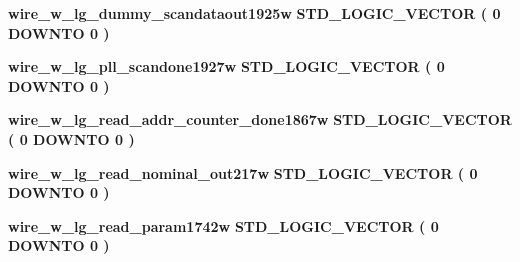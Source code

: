 \begin{DoxyCompactItemize}
\item 
{\bf wire\+\_\+w\+\_\+lg\+\_\+dummy\+\_\+scandataout1925w} {\bfseries \textcolor{comment}{S\+T\+D\+\_\+\+L\+O\+G\+I\+C\+\_\+\+V\+E\+C\+T\+OR}\textcolor{vhdlchar}{ }\textcolor{vhdlchar}{(}\textcolor{vhdlchar}{ }\textcolor{vhdlchar}{ } \textcolor{vhdldigit}{0} \textcolor{vhdlchar}{ }\textcolor{keywordflow}{D\+O\+W\+N\+TO}\textcolor{vhdlchar}{ }\textcolor{vhdlchar}{ } \textcolor{vhdldigit}{0} \textcolor{vhdlchar}{ }\textcolor{vhdlchar}{)}\textcolor{vhdlchar}{ }} 
\item 
{\bf wire\+\_\+w\+\_\+lg\+\_\+pll\+\_\+scandone1927w} {\bfseries \textcolor{comment}{S\+T\+D\+\_\+\+L\+O\+G\+I\+C\+\_\+\+V\+E\+C\+T\+OR}\textcolor{vhdlchar}{ }\textcolor{vhdlchar}{(}\textcolor{vhdlchar}{ }\textcolor{vhdlchar}{ } \textcolor{vhdldigit}{0} \textcolor{vhdlchar}{ }\textcolor{keywordflow}{D\+O\+W\+N\+TO}\textcolor{vhdlchar}{ }\textcolor{vhdlchar}{ } \textcolor{vhdldigit}{0} \textcolor{vhdlchar}{ }\textcolor{vhdlchar}{)}\textcolor{vhdlchar}{ }} 
\item 
{\bf wire\+\_\+w\+\_\+lg\+\_\+read\+\_\+addr\+\_\+counter\+\_\+done1867w} {\bfseries \textcolor{comment}{S\+T\+D\+\_\+\+L\+O\+G\+I\+C\+\_\+\+V\+E\+C\+T\+OR}\textcolor{vhdlchar}{ }\textcolor{vhdlchar}{(}\textcolor{vhdlchar}{ }\textcolor{vhdlchar}{ } \textcolor{vhdldigit}{0} \textcolor{vhdlchar}{ }\textcolor{keywordflow}{D\+O\+W\+N\+TO}\textcolor{vhdlchar}{ }\textcolor{vhdlchar}{ } \textcolor{vhdldigit}{0} \textcolor{vhdlchar}{ }\textcolor{vhdlchar}{)}\textcolor{vhdlchar}{ }} 
\item 
{\bf wire\+\_\+w\+\_\+lg\+\_\+read\+\_\+nominal\+\_\+out217w} {\bfseries \textcolor{comment}{S\+T\+D\+\_\+\+L\+O\+G\+I\+C\+\_\+\+V\+E\+C\+T\+OR}\textcolor{vhdlchar}{ }\textcolor{vhdlchar}{(}\textcolor{vhdlchar}{ }\textcolor{vhdlchar}{ } \textcolor{vhdldigit}{0} \textcolor{vhdlchar}{ }\textcolor{keywordflow}{D\+O\+W\+N\+TO}\textcolor{vhdlchar}{ }\textcolor{vhdlchar}{ } \textcolor{vhdldigit}{0} \textcolor{vhdlchar}{ }\textcolor{vhdlchar}{)}\textcolor{vhdlchar}{ }} 
\item 
{\bf wire\+\_\+w\+\_\+lg\+\_\+read\+\_\+param1742w} {\bfseries \textcolor{comment}{S\+T\+D\+\_\+\+L\+O\+G\+I\+C\+\_\+\+V\+E\+C\+T\+OR}\textcolor{vhdlchar}{ }\textcolor{vhdlchar}{(}\textcolor{vhdlchar}{ }\textcolor{vhdlchar}{ } \textcolor{vhdldigit}{0} \textcolor{vhdlchar}{ }\textcolor{keywordflow}{D\+O\+W\+N\+TO}\textcolor{vhdlchar}{ }\textcolor{vhdlchar}{ } \textcolor{vhdldigit}{0} \textcolor{vhdlchar}{ }\textcolor{vhdlchar}{)}\textcolor{vhdlchar}{ }} 
\item 

\end{DoxyCompactItemize}
